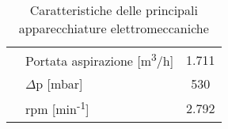 \begin{table}[!h]
\begin{center}
\begin{tabular}{|c|l|c|}
			& Portata aspirazione {[}m\textsuperscript{3}/h{]} & 1.711 \\
			& $\Delta$p {[}mbar{]}                  & 530   \\
			& rpm {[}min\textsuperscript{-1}{]}                  & 2.792 \\ \hline
		\end{tabular}
		\caption{Caratteristiche delle principali apparecchiature elettromeccaniche}
		\label{tab:c_macchinari}
	\end{center}
\end{table}



